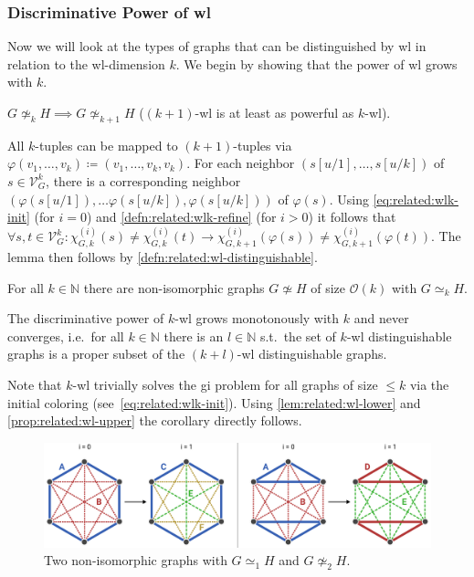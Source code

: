 \subsubsection{Discriminative Power of \acs{wl}}
Now we will look at the types of graphs that can be distinguished by \ac{wl} in relation to the \acs{wl}-dimension $k$.
We begin by showing that the power of \ac{wl} grows with $k$.
\begin{lem}\label{lem:related:wl-lower}
	$G \mathrel{\not\simeq_k} H \implies G \mathrel{\not\simeq_{k+1}} H$ ($(k+1)$-\acs{wl} is at least as powerful as $k$-\acs{wl}).
\end{lem}
\begin{hproof}
	All $k$-tuples can be mapped to $(k+1)$-tuples via $\varphi(v_1, \dots, v_k) \coloneqq (v_1, \dots,\allowbreak v_k, v_k)$.
	For each neighbor $(s[u/1], \dots,\allowbreak s[u/k])$ of $s \in \mathcal{V}_G^k$, there is a corresponding neighbor $(\varphi(s[u/1]), \dots \varphi(s[u/k]), \varphi(s[u/k]))$ of $\varphi(s)$.
	Using \cref{eq:related:wlk-init} (for $i = 0$) and \cref{defn:related:wlk-refine} (for $i > 0$) it follows that $\forall s, t \in \mathcal{V}_G^k: \chi_{G, k}^{(i)}(s) \neq \chi_{G, k}^{(i)}(t) \rightarrow \chi_{G, k+1}^{(i)}(\varphi(s)) \neq \chi_{G, k+1}^{(i)}(\varphi(t))$.
	The lemma then follows by \cref{defn:related:wl-distinguishable}.
\end{hproof}
\begin{prop}\label{prop:related:wl-upper}
	For all $k \in \mathbb{N}$ there are non-isomorphic graphs $G \not\simeq H$ of size $\mathcal{O}(k)$ with $G \mathrel{\simeq_k} H$.
\end{prop}
\begin{cor}\label{cor:related:wl-monotonous}
	The discriminative power of $k$-\acs{wl} grows monotonously with $k$ and never converges, i.e.\ for all $k \in \mathbb{N}$ there is an $l \in \mathbb{N}$ s.t.\ the set of $k$-\ac{wl} distinguishable graphs is a proper subset of the $(k+l)$-\ac{wl} distinguishable graphs.
\end{cor}
\begin{hproof}
	Note that $k$-\acs{wl} trivially solves the \ac{gi} problem for all graphs of size $\leq k$ via the initial coloring (see~\cref{eq:related:wlk-init}).
	Using \cref{lem:related:wl-lower} and \cref{prop:related:wl-upper} the corollary directly follows.
\end{hproof}
\begin{figure}[ht]
	\centering
	\includegraphics[width=\linewidth]{gfx/related-work/wl2-problem-solution.pdf}
	\caption{
		Two non-isomorphic graphs with $G \mathrel{\simeq_1} H$ and $G \mathrel{\not\simeq_2} H$.
	}\label{fig:related:wl2-problem-solution}
\end{figure}
